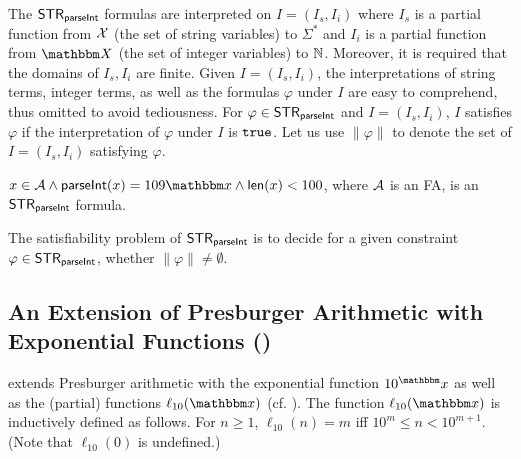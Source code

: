 The ${\sf STR}_{\textsf{parseInt}}$ formulas are interpreted on $I=(I_s, I_i)$ where $I_s$ is a partial function from $\mathcal{X}$ (the set of string variables) to $\Sigma^*$ and $I_i$ is a partial function from $\ivars$ (the set of integer variables) to $\mathbb{N}$. Moreover, it is required that the domains of $I_s, I_i$ are finite. Given $I = (I_s, I_i)$, the interpretations of string terms, integer terms, as well as the formulas $\varphi$ under $I$ are easy to comprehend, thus omitted to avoid tediousness. For $\varphi \in {\sf STR}_{\textsf{parseInt}}$ and $I = (I_s, I_i)$, $I$ satisfies $\varphi$ if the interpretation of $\varphi$ under $I$ is $\mathtt{true}$.
Let us use $\lVert \varphi \rVert$ to denote the set of $I = (I_s, I_i)$ satisfying $\varphi$.

\begin{example}
$\svarx \in \Aut \wedge \parseInt(\svarx) = 109\ivarx \wedge \len(\svarx) < 100$, where $\mathcal{A}$ is an FA, is an ${\sf STR}_{\textsf{parseInt}}$ formula.
\end{example}


The satisfiability problem of ${\sf STR}_{\textsf{parseInt}}$ is to decide for a given constraint $\varphi \in {\sf STR}_{\textsf{parseInt}}$,
whether $\lVert  \varphi \rVert \neq \emptyset$.

\subsection{An Extension of Presburger Arithmetic with Exponential Functions (\paexp)}

{\paexp} extends Presburger arithmetic with the exponential function $10^\ivarx$ as well as the (partial) functions $\ell_{10}(\ivarx)$ (cf. \cite{Point86}). The function $\ell_{10}(\ivarx)$ is inductively defined as follows. For $n \ge 1$, $\ell_{10}(n) = m$ iff $10^m \le n < 10^{m+1}$. (Note that $\ell_{10}(0)$ is undefined.)
%

